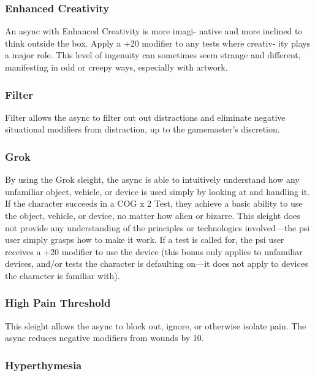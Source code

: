 \subsubsection{Enhanced Creativity}

An async with Enhanced Creativity is more imagi-
native and more inclined to think outside the box. 
Apply a +20 modifier to any tests where creativ-
ity plays a major role. This level of ingenuity can 
sometimes seem strange and different, manifesting 
in odd or creepy ways, especially with artwork.

\subsubsection{Filter}

Filter allows the async to filter out out distractions 
and eliminate negative situational modifiers from 
distraction, up to the gamemaster's discretion.

\subsubsection{Grok}

By using the Grok sleight, the async is able to 
intuitively understand how any unfamiliar object, 
vehicle, or device is used simply by looking at and 
handling it. If the character succeeds in a COG x 2 
Test, they achieve a basic ability to use the object, 
vehicle, or device, no matter how alien or bizarre. 
This sleight does not provide any understanding of 
the principles or technologies involved—the psi user 
simply grasps how to make it work. If a test is called 
for, the psi user receives a +20 modifier to use the 
device (this bonus only applies to unfamiliar devices, 
and/or tests the character is defaulting on—it does not 
apply to devices the character is familiar with).

\subsubsection{High Pain Threshold}

This sleight allows the async to block out, ignore, or 
otherwise isolate pain. The async reduces negative 
modifiers from wounds by 10.

\subsubsection{Hyperthymesia}

